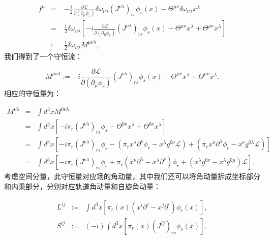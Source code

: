 \documentclass[10pt,UTF8]{ctexart}
\begin{document}
\begin{eqnarray}
f^{\mu} & = & -\frac{i}{2}\frac{\partial\mathcal{L}}{\partial\left(\partial_{\mu}\phi_{r}\right)}\delta\omega_{\nu\lambda}\left(J^{\nu\lambda}\right)_{rs}\phi_{s}\left(x\right)-\Theta^{\mu\nu}\delta\omega_{\nu\lambda}x^{\lambda}\nonumber \\
 & = & \frac{1}{2}\delta\omega_{\nu\lambda}\left[-i\frac{\partial\mathcal{L}}{\partial\left(\partial_{\mu}\phi_{r}\right)}\left(J^{\nu\lambda}\right)_{rs}\phi_{s}\left(x\right)-\Theta^{\mu\nu}x^{\lambda}+\Theta^{\mu\nu}x^{\lambda}\right]\nonumber \\
 & := & \frac{1}{2}\delta\omega_{\nu\lambda}M^{\mu\nu\lambda},
\end{eqnarray}
我们得到了一个守恒流：

\begin{equation}
M^{\mu\nu\lambda}:=-i\frac{\partial\mathcal{L}}{\partial\left(\partial_{\mu}\phi_{r}\right)}\left(J^{\nu\lambda}\right)_{rs}\phi_{s}\left(x\right)-\Theta^{\mu\nu}x^{\lambda}+\Theta^{\mu\nu}x^{\lambda}.
\end{equation}
相应的守恒量为： 

\begin{eqnarray}
M^{\nu\lambda} & = & \int d^{3}xM^{0\nu\lambda}\nonumber \\
 & = & \int d^{3}x\left[-i\pi_{r}\left(J^{\nu\lambda}\right)_{rs}\phi_{s}-\Theta^{0\nu}x^{\lambda}+\Theta^{0\nu}x^{\lambda}\right]\nonumber \\
 & = & \int d^{3}x\left[-i\pi_{r}\left(J^{\nu\lambda}\right)_{rs}\phi_{s}-\left(\pi_{r}x^{\lambda}\partial^{\nu}\phi_{r}-x^{\lambda}g^{0\nu}\mathcal{L}\right)+\left(\pi_{r}x^{\nu}\partial^{\lambda}\phi_{r}-x^{\nu}g^{0\lambda}\mathcal{L}\right)\right]\nonumber \\
 & = & \int d^{3}x\left[-i\pi_{r}\left(J^{\nu\lambda}\right)_{rs}\phi_{s}+\pi_{r}\left(x^{\nu}\partial^{\lambda}-x^{\lambda}\partial^{\nu}\right)\phi_{r}+\left(x^{\lambda}g^{0\nu}-x^{\lambda}g^{0\mu}\right)\mathcal{L}\right].
\end{eqnarray}
考虑空间分量，此守恒量对应场的角动量，其中我们还可以将角动量拆成坐标部分和内秉部分，分别对应轨道角动量和自旋角动量：

\begin{eqnarray}
L^{ij} & := & \int d^{3}x\left[\pi_{r}\left(x\right)\left(x^{i}\partial^{j}-x^{j}\partial^{i}\right)\phi_{r}\left(x\right)\right],\\
S^{ij} & := & \left(-i\right)\int d^{3}x\left[\pi_{r}\left(x\right)\left(J^{ij}\right)_{rs}\phi_{s}\left(x\right)\right].
\end{eqnarray}
\end{document}
